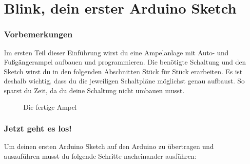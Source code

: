 \section{Blink, dein erster Arduino Sketch}\label{sec:blink}

\subsubsection{Vorbemerkungen}
Im ersten Teil dieser Einführung wirst du eine Ampelanlage mit Auto- und Fußgängerampel aufbauen und programmieren. Die benötigte Schaltung und den Sketch wirst du in den folgenden Abschnitten Stück für Stück erarbeiten. Es ist deshalb wichtig, dass du die jeweiligen Schaltpläne möglichst genau aufbaust. So sparst du Zeit, da du deine Schaltung nicht umbauen musst. 

\begin{figure}[h]
  \begin{center}
  \label{fig:ample}
  \caption{Die fertige Ampel}
  \end{center}
\end{figure}
  
\clearpage

\subsubsection{Jetzt geht es los!}

Um deinen ersten Arduino Sketch auf den Arduino zu übertragen und auszuführen musst du folgende Schritte nacheinander ausführen:

